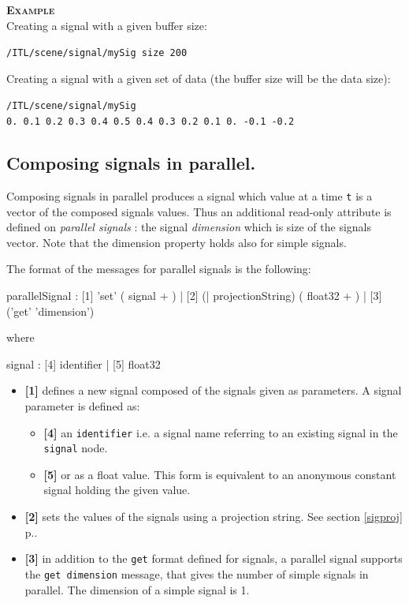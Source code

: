 \documentclass[a4paper,twoside]{report}
\newcommand{\subsublevel}[1]	{\subsection{#1}}
\newcommand{\fullref}[1]	{\ref{#1} p.\pageref{#1}}
\newcommand{\OSC}[1]		{\texttt{#1}}
\newcommand{\values}[1]	{\texttt{#1}}
\newcommand{\example}		{\textbf{\hspace{-1.5cm}\textbf{\textsc{Example }}}}
\newcommand{\sample}	[1]			{\vspace{-2mm}\begin{center}\colorbox{mygrey}{
								\begin{minipage}[t]{0.9\columnwidth} 
								{\small \texttt{#1}}
								\end{minipage}}\end{center}}
\begin{document}
\example \\
Creating a signal with a given buffer size:
\sample{/ITL/scene/signal/mySig size 200}
Creating a signal with a given set of data (the buffer size will be the data size):
\sample{/ITL/scene/signal/mySig 0.\ 0.1\ 0.2\ 0.3\ 0.4\ 0.5\ 0.4\ 0.3\ 0.2\ 0.1\ 0.\ -0.1\ -0.2}


\subsublevel{Composing signals in parallel.}\label{parcomp}
Composing signals in parallel produces a signal which value at a time \values{t} is a vector of the composed signals values. Thus an additional read-only attribute is defined on \emph{parallel signals} : the signal \emph{dimension} which is size of the signals vector. Note that the dimension property holds also for simple signals.

The format of the messages for parallel signals is the following:
\begin{rail}
parallelSignal :  
		  [1] 'set' ( signal + )
		| [2] (| projectionString) ( float32 + )
		| [3] ('get' 'dimension') 
\end{rail}
where 
\begin{rail}
signal :  
		  [4] identifier
		| [5] float32
\end{rail}

\begin{itemize}
\item \textbf{[1]} defines a new signal composed of the signals given as parameters. A signal parameter is defined as:

\begin{itemize}
\item \textbf{[4]} an \OSC{identifier} i.e. a signal name referring to an existing signal in the \OSC{signal} node. 
\item \textbf{[5]} or as a float value. This form is equivalent to an anonymous constant signal holding the given value. 
\end{itemize}

\item \textbf{[2]} sets the values of the signals using a projection string. See section \fullref{sigproj}. 
\item \textbf{[3]} in addition to the \OSC{get} format defined for signals, a parallel signal supports the \OSC{get dimension} message, that gives the number of simple signals in parallel. The dimension of a simple signal is 1. 
\end{itemize}
\end{document}

